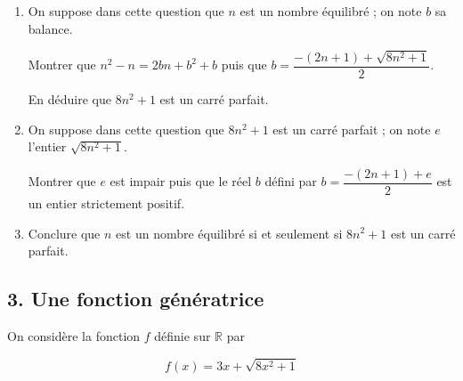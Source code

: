 \begin{enumerate}
    \item On suppose dans cette question que \( n \) est un nombre équilibré ; on note \( b \) sa balance.
    
    Montrer que \( n^2 - n = 2bn + b^2 + b \) puis que \( b = \dfrac{-(2n+1)+\sqrt{8n^2+1}}{2} \).
    
    En déduire que \( 8n^2 + 1 \) est un carré parfait.
    
    \item On suppose dans cette question que \( 8n^2 + 1 \) est un carré parfait ; on note \( e \) l'entier \( \sqrt{8n^2 + 1} \).
    
    Montrer que \( e \) est impair puis que le réel \( b \) défini par \( b = \dfrac{-(2n+1)+e}{2} \) est un entier strictement positif.
    
    \item Conclure que \( n \) est un nombre équilibré si et seulement si \( 8n^2 + 1 \) est un carré parfait.
\end{enumerate}

\subsection*{3. Une fonction génératrice}

On considère la fonction \( f \) définie sur \( \mathbb{R} \) par

\[f(x) = 3x + \sqrt{8x^2 + 1}\]

